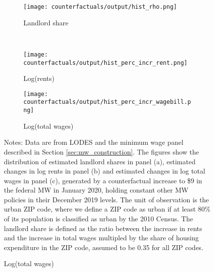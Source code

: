 \begin{figure}[h!]
    \centering
    \caption{Distributions of estimated landlord shares and counterfactual 
                changes in rents and total wages, urban ZIP codes}
    \label{fig:cf_hist_rents_wages_shares}

    \begin{subfigure}{0.65\textwidth}
        \caption*{Landlord share}
        \texttt{[image: counterfactuals/output/hist\_rho.png]}
    \end{subfigure}\\
    \begin{subfigure}{0.5\textwidth}
        \texttt{[image: counterfactuals/output/hist\_perc\_incr\_rent.png]}
        \caption*{Log(rents)}
    \end{subfigure}%
    \begin{subfigure}{0.5\textwidth}
        \texttt{[image: counterfactuals/output/hist\_perc\_incr\_wagebill.png]}
        \caption*{Log(total wages)}
    \end{subfigure}

    \begin{minipage}{.95\textwidth} \footnotesize
        \vspace{3mm}
        Notes: 
        Data are from LODES and the minimum wage panel described in Section 
        \ref{sec:mw_construction}.
        The figures show the distribution of estimated landlord shares in 
        panel (a), estimated changes in log rents in panel (b) and 
        estimated changes in log total wages in panel (c),
        generated by a counterfactual increase to \$9 in the federal MW in 
        January 2020, holding constant other MW policies in their December 2019 
        levels.
        The unit of observation is the urban ZIP code, where we define a ZIP code 
        as urban if at least 80\% of its population is classified as urban by
        the 2010 Census.
        The landlord share is defined as the ratio between the increase in rents
        and the increase in total wages multipled by the share of housing 
        expenditure in the ZIP code, assumed to be 0.35 for all ZIP codes.
    \end{minipage}
\end{figure}
